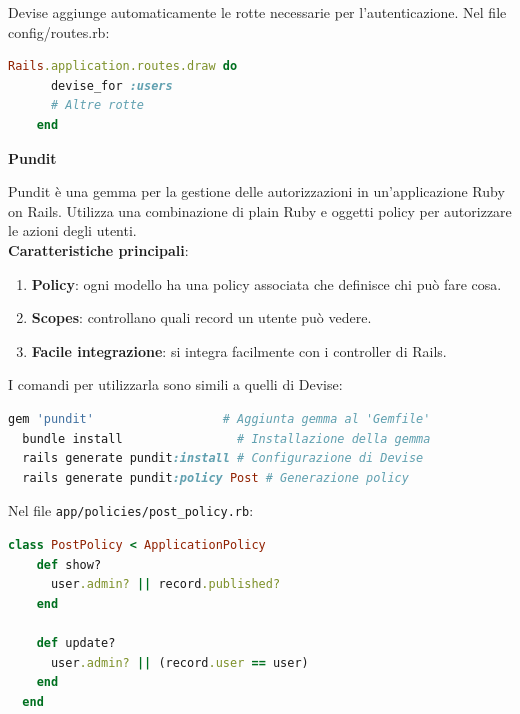 \documentclass[a4paper, 12pt]{book}
\begin{document}
\newpage

Devise aggiunge automaticamente le rotte necessarie per l'autenticazione. Nel file config/routes.rb:\\

\begin{lstlisting}[language=ruby, caption=Configurazione delle rotte]
    Rails.application.routes.draw do
      devise_for :users
      # Altre rotte
    end
    \end{lstlisting}

\textbf{Pundit}

Pundit \cite{Pundit} è una gemma per la gestione delle autorizzazioni in un'applicazione Ruby on Rails.
Utilizza una combinazione di plain Ruby e oggetti policy per autorizzare le azioni degli utenti.\\

\textbf{Caratteristiche principali}:
\begin{enumerate}
  \item \textbf{Policy}: ogni modello ha una policy associata che definisce chi può fare cosa.
  \item \textbf{Scopes}: controllano quali record un utente può vedere.
  \item \textbf{Facile integrazione}: si integra facilmente con i controller di Rails.
\end{enumerate}

I comandi per utilizzarla sono simili a quelli di Devise:\\

\begin{lstlisting}[language=ruby, caption=Utilizzo di Pundit]
  gem 'pundit'                  # Aggiunta gemma al 'Gemfile'
  bundle install                # Installazione della gemma
  rails generate pundit:install # Configurazione di Devise
  rails generate pundit:policy Post # Generazione policy
  \end{lstlisting}

\newpage

Nel file \texttt{app/policies/post\_policy.rb}:\\

\begin{lstlisting}[language=ruby, caption=Definizione delle autorizzazioni nella policy]
  class PostPolicy < ApplicationPolicy
    def show?
      user.admin? || record.published?
    end

    def update?
      user.admin? || (record.user == user)
    end
  end
  \end{lstlisting}
\end{document}
